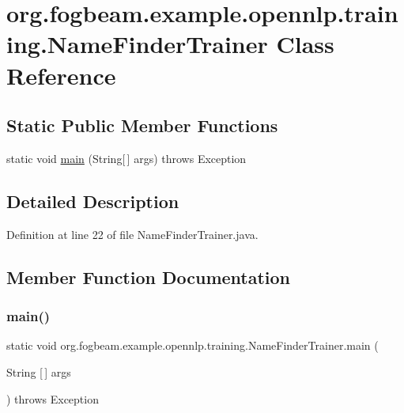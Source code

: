 \hypertarget{classorg_1_1fogbeam_1_1example_1_1opennlp_1_1training_1_1_name_finder_trainer}{}\section{org.\+fogbeam.\+example.\+opennlp.\+training.\+Name\+Finder\+Trainer Class Reference}
\label{classorg_1_1fogbeam_1_1example_1_1opennlp_1_1training_1_1_name_finder_trainer}
\subsection*{Static Public Member Functions}
\begin{DoxyCompactItemize}
\item 
static void \hyperlink{classorg_1_1fogbeam_1_1example_1_1opennlp_1_1training_1_1_name_finder_trainer_a5598df8b5f8ffb35f022358ed3b124ed}{main} (String\mbox{[}$\,$\mbox{]} args)  throws Exception 	
\end{DoxyCompactItemize}


\subsection{Detailed Description}


Definition at line 22 of file Name\+Finder\+Trainer.\+java.



\subsection{Member Function Documentation}
\hypertarget{classorg_1_1fogbeam_1_1example_1_1opennlp_1_1training_1_1_name_finder_trainer_a5598df8b5f8ffb35f022358ed3b124ed}{}\label{classorg_1_1fogbeam_1_1example_1_1opennlp_1_1training_1_1_name_finder_trainer_a5598df8b5f8ffb35f022358ed3b124ed} 
\subsubsection{\texorpdfstring{main()}{main()}}
{\footnotesize\ttfamily static void org.\+fogbeam.\+example.\+opennlp.\+training.\+Name\+Finder\+Trainer.\+main (\begin{DoxyParamCaption}\item[{String \mbox{[}$\,$\mbox{]}}]{args }\end{DoxyParamCaption}) throws Exception\hspace{0.3cm}{\ttfamily [static]}}



